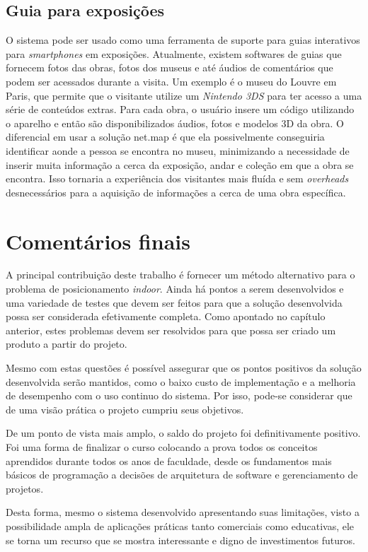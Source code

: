 \subsection{Guia para exposições}
O sistema pode ser usado como uma ferramenta de suporte para guias interativos para \textit{smartphones} em exposições. Atualmente, existem softwares de guias que fornecem fotos das obras, fotos dos museus e até áudios de comentários que podem ser acessados durante a visita. Um exemplo é o museu do Louvre em Paris, que permite que o visitante utilize um \textit{Nintendo 3DS} para ter acesso a uma série de conteúdos extras. Para cada obra, o usuário insere um código utilizando o aparelho e então são disponibilizados áudios, fotos e modelos 3D da obra. O diferencial em usar a solução net.map é que ela possivelmente conseguiria identificar aonde a pessoa se encontra no museu, minimizando a necessidade de inserir muita informação a cerca da exposição, andar e coleção em que a obra se encontra. Isso tornaria a experiência dos visitantes mais fluída e sem \textit{overheads} desnecessários para a aquisição de informações a cerca de uma obra específica.

\section{Comentários finais}

A principal contribuição deste trabalho é fornecer um método alternativo para o problema de posicionamento \textit{indoor}. Ainda há pontos a serem desenvolvidos e uma variedade de testes que devem ser feitos para que a solução desenvolvida possa ser considerada efetivamente completa. Como apontado no capítulo anterior, estes problemas devem ser resolvidos para que possa ser criado um produto a partir do projeto.\par
Mesmo com estas questões é possível assegurar que os pontos positivos da solução desenvolvida serão mantidos, como o baixo custo de implementação e a melhoria de desempenho com o uso continuo do sistema. Por isso, pode-se considerar que de uma visão prática o projeto cumpriu seus objetivos.\par
De um ponto de vista mais amplo, o saldo do projeto foi definitivamente positivo. Foi uma forma de finalizar o curso colocando a prova todos os conceitos aprendidos durante todos os anos de faculdade, desde os fundamentos mais básicos de programação a decisões de arquitetura de software e gerenciamento de projetos.\par
Desta forma, mesmo o sistema desenvolvido apresentando suas limitações, visto a possibilidade ampla de aplicações práticas tanto comerciais como educativas, ele se torna um recurso que se mostra interessante e digno de investimentos futuros.
